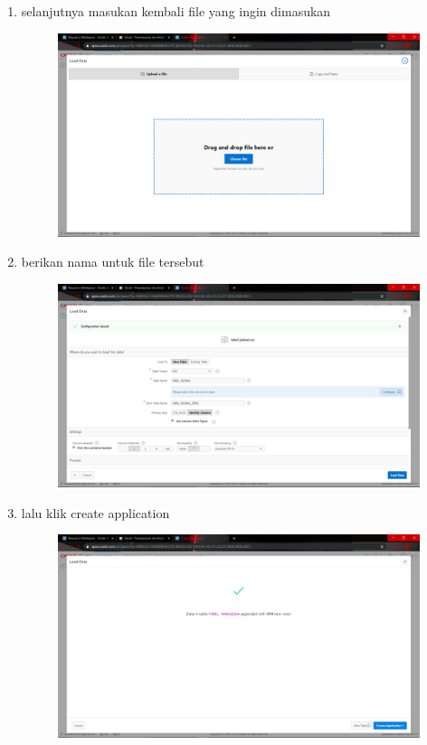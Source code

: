 \begin{enumerate}
\item selanjutnya masukan kembali file yang ingin dimasukan 
\begin{figure}[H]
    \centering
    \includegraphics[scale=0.1]{figures/17}
    \caption{}
    \label{Environment3}
\end{figure}

\item berikan nama untuk file tersebut
\begin{figure}[H]
    \centering
    \includegraphics[scale=0.1]{figures/18}
    \caption{}
    \label{Environment4}
\end{figure}

\item lalu klik create application
\begin{figure}[H]
    \centering
    \includegraphics[scale=0.1]{figures/19}
    \caption{}
    \label{Environment5}
\end{figure}


\end{enumerate}
